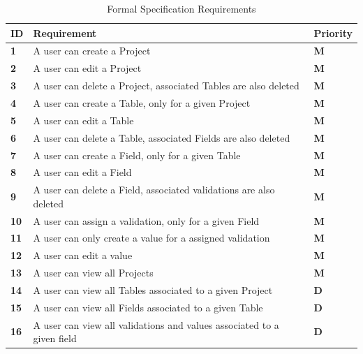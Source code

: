 \documentclass[a4paper,12pt]{article}
\begin{document}
\begin{table}
\centering
\caption{Formal Specification Requirements}
\label{req:1}
\begin{tabularx}{\textwidth}{|l|X|l|}
\hline
\textbf{ID} & \textbf{Requirement}                                                   & \textbf{Priority} \\ \hline
\textbf{1}  & A user can create a Project                                            & \textbf{M}        \\ \hline
\textbf{2}  & A user can edit a Project                                              & \textbf{M}        \\ \hline
\textbf{3}  & A user can delete a Project, associated Tables are also deleted        & \textbf{M}        \\ \hline
\textbf{4}  & A user can create a Table, only for a given  Project                   & \textbf{M}        \\ \hline
\textbf{5}  & A user can edit a Table                                                & \textbf{M}        \\ \hline
\textbf{6}  & A user can delete a Table, associated Fields are also deleted          & \textbf{M}        \\ \hline
\textbf{7}  & A user can create a Field, only for a given Table                      & \textbf{M}        \\ \hline
\textbf{8}  & A user can edit a Field                                                & \textbf{M}        \\ \hline
\textbf{9}  & A user can delete a Field, associated validations are also deleted     & \textbf{M}        \\ \hline
\textbf{10} & A user can assign a validation, only for a given Field       & \textbf{M}        \\ \hline
\textbf{11} & A user can only create a value for a assigned validation                  & \textbf{M}        \\ \hline
\textbf{12} & A user can edit a  value                      & \textbf{M}        \\ \hline
\textbf{13} & A user can view all Projects                 & \textbf{M}        \\ \hline
\textbf{14} & A user can view all Tables associated to a given Project               & \textbf{D}        \\ \hline
\textbf{15} & A user can view all Fields associated to a given Table                 & \textbf{D}        \\ \hline
\textbf{16} & A user can view all validations and values associated to a given field & \textbf{D}        \\ \hline
\end{tabularx}
\end{table}
\end{document}
